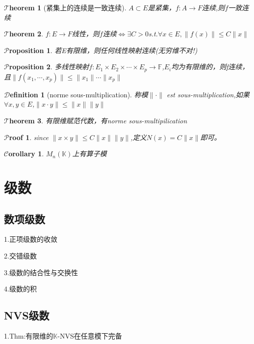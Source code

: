 \documentclass[hyperfer,UTF8,a4paper,12pt]{article}
\theoremstyle{plain}
\newtheorem{Thm}{$\mathcal{T}$heorem}
\newtheorem*{Prf}{$\mathcal{P}$roof}
\newtheorem*{Cor}{$\mathcal{C}$orollary}
\newtheorem*{Prop}{$\mathcal{P}$roposition}
\newtheorem{Def}{{$\mathcal{D}$efinition}}[section]
\begin{document}
\begin{Thm}[紧集上的连续是一致连续]
	$ A\subset E $是紧集，$ f:A\to F $连续,则$ f $一致连续
\end{Thm}

\begin{Thm}
	$ f:E\to F $线性，则$ f $连续$\Leftrightarrow$$ \exists C>0 $s.t.$ \forall x\in E,\|f(x)\|\leq C\|x\|  $
\end{Thm}

\begin{Prop}
	若E有限维，则任何线性映射连续(无穷维不对!)
\end{Prop}

\begin{Prop}
	多线性映射$ f:E_1\times E_2\times\cdots\times E_p\to \mathbb{F} $,$ E_i $均为有限维的，则f连续，且$ \|f(x_1,\cdots,x_p)\|\leqslant\|x_1\|\cdots\|x_p\| $
\end{Prop}

\begin{Def}[norme sous-multiplication]
	称模$ \|\cdot\| $ est sous-multiplication,如果$ \forall x,y\in E $,$ \|x\cdot y\|\leqslant\|x\|\|y\| $
\end{Def}

\begin{Thm}
	有限维赋范代数，有norme sous-multipilication
\end{Thm}
\begin{Prf}
	since $ \|x\times y\|\leqslant C\|x\|\|y\| $,定义$ N(x)=C\|x\| $即可。
\end{Prf}

\begin{Cor}
	$ M_n(\mathbb{K}) $上有算子模
\end{Cor}


\section{级数}

\subsection{数项级数}
    1.正项级数的收敛

    2.交错级数

    3.级数的结合性与交换性

    4.级数的积


\subsection{NVS级数}
    1.Thm:有限维的$\mathbb{K}$-NVS在任意模下完备
\end{document}
